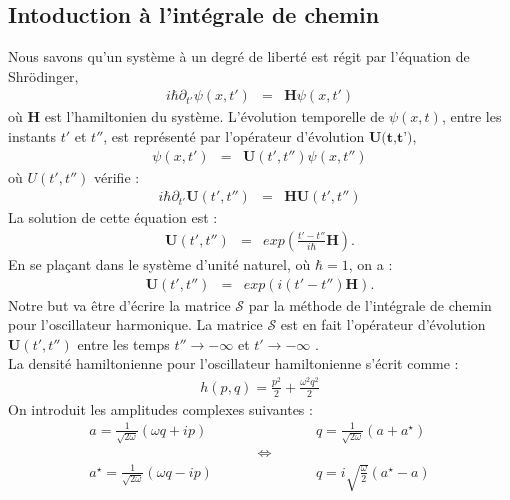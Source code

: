 \documentclass[a4paper,11pt]{article} %
\theoremstyle{plain}
\theoremstyle{definition}
\theoremstyle{remark}
\numberwithin{equation}{section}
\numberwithin{equation}{subsection}
\numberwithin{figure}{section}
\begin{document}
  \subsection{Intoduction à l'intégrale de chemin}
 
\noindent
Nous savons qu'un système à un degré de liberté est régit par l'équation de Shrödinger,
\begin{eqnarray*}
 i \hbar \partial_{t'} \psi(x,t') &=& \textbf{H} \psi(x,t')
\end{eqnarray*}
où $\textbf{H}$ est l'hamiltonien du système. L'évolution temporelle de $\psi(x,t)$, entre les instants $t'$ et $t''$, est représenté par l'opérateur d'évolution $\textbf{U(t,t')}$,
\begin{eqnarray*}
 \psi (x,t') &=& \textbf{U}(t',t'') \psi (x,t'')
\end{eqnarray*}
où $U(t',t'')$ vérifie :
\begin{eqnarray*}
  i \hbar \partial_{t'}  \textbf{U}(t',t'') &=& \textbf{H}  \textbf{U}(t',t'')
\end{eqnarray*}
La solution de cette équation est :
\begin{eqnarray*}
  \textbf{U}(t',t'') &=& exp \left( \frac{t'-t''}{i \hbar}  \textbf{H} \right).
\end{eqnarray*}
En se plaçant dans le système d'unité naturel, où $\hbar=1$, on a :
\begin{eqnarray*}
  \textbf{U}(t',t'') &=& exp \left( i (t'-t'') \textbf{H} \right).
\end{eqnarray*}
Notre but va être d'écrire la matrice $\mathcal{S}$ par la méthode de l'intégrale de chemin pour l'oscillateur harmonique. La matrice $\mathcal{S}$ est en fait l'opérateur d'évolution $ \textbf{U}(t',t'') $  entre les temps $t'' \rightarrow - \infty$ et $t' \rightarrow - \infty$ . \\
La densité hamiltonienne pour l'oscillateur hamiltonienne s'écrit comme :
\begin{eqnarray*}
 h(p,q) = \frac{p^{2}}{2} + \frac{\omega^{2}q^{2}}{2}
\end{eqnarray*}
On introduit les amplitudes complexes suivantes :
\begin{eqnarray*}
 a = \frac{1}{\sqrt{2 \omega}} \left( \omega q + i p \right)  \hspace{1cm}  &&  
\hspace{1cm} q =  \frac{1}{\sqrt{2 \omega}} \left( a + a^{\star} \right)\\
&\Longleftrightarrow&  \\
 a^{\star} = \frac{1}{\sqrt{2 \omega}} \left( \omega q - i p \right)   \hspace{1cm}  &&  
\hspace{1cm} q = i \sqrt{\frac{\omega}{2}} \left( a^{\star} - a \right)\\
\end{eqnarray*}
\end{document}
